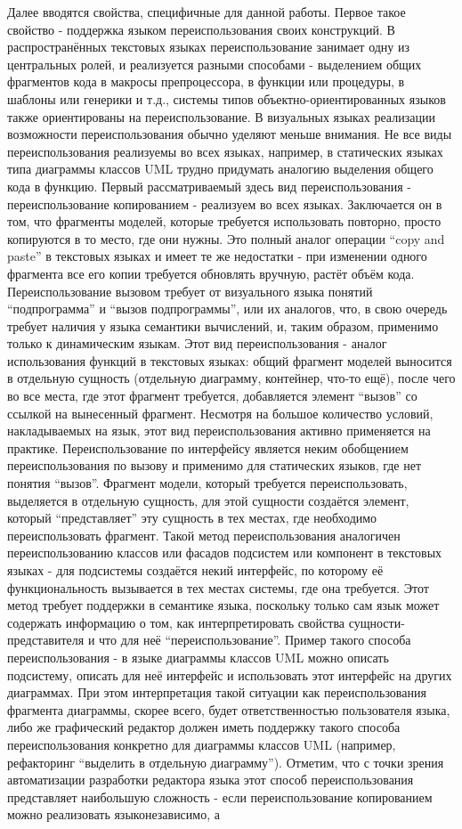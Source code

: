 Далее вводятся свойства, специфичные для данной работы. Первое такое свойство - поддержка языком переиспользования своих конструкций. В распространённых текстовых языках переиспользование занимает одну из центральных ролей, и реализуется разными способами - выделением общих фрагментов кода в макросы препроцессора, в функции или процедуры, в шаблоны или генерики и т.д., системы типов объектно-ориентированных языков также ориентированы на переиспользование. В визуальных языках реализации возможности переиспользования обычно уделяют меньше внимания. Не все виды переиспользования реализуемы во всех языках, например, в статических языках типа диаграммы классов UML трудно придумать аналогию выделения общего кода в функцию. Первый рассматриваемый здесь вид переиспользования - переиспользование копированием - реализуем во всех языках. Заключается он в том, что фрагменты моделей, которые требуется использовать повторно, просто копируются в то место, где они нужны. Это полный аналог операции “copy and paste” в текстовых языках и имеет те же недостатки - при изменении одного фрагмента все его копии требуется обновлять вручную, растёт объём кода. Переиспользование вызовом требует от визуального языка понятий “подпрограмма” и “вызов подпрограммы”, или их аналогов, что, в свою очередь требует наличия у языка семантики вычислений, и, таким образом, применимо только к динамическим языкам. Этот вид переиспользования - аналог использования функций в текстовых языках: общий фрагмент моделей выносится в отдельную сущность (отдельную диаграмму, контейнер, что-то ещё), после чего во все места, где этот фрагмент требуется, добавляется элемент “вызов” со ссылкой на вынесенный фрагмент. Несмотря на большое количество условий, накладываемых на язык, этот вид переиспользования активно применяется на практике. Переиспользование по интерфейсу является неким обобщением переиспользования по вызову и применимо для статических языков, где нет понятия “вызов”. Фрагмент модели, который требуется переиспользовать, выделяется в отдельную сущность, для этой сущности создаётся элемент, который “представляет” эту сущность в тех местах, где необходимо переиспользовать фрагмент. Такой метод переиспользования аналогичен переиспользованию классов или фасадов подсистем или компонент в текстовых языках - для подсистемы создаётся некий интерфейс, по которому её функциональность вызывается в тех местах системы, где она требуется. Этот метод требует поддержки в семантике языка, поскольку только сам язык может содержать информацию о том, как интерпретировать свойства сущности-представителя и что для неё “переиспользование”. Пример такого способа переиспользования - в языке диаграммы классов UML можно описать подсистему, описать для неё интерфейс и использовать этот интерфейс на других диаграммах. При этом интерпретация такой ситуации как переиспользования фрагмента диаграммы, скорее всего, будет ответственностью пользователя языка, либо же графический редактор должен иметь поддержку такого способа переиспользования конкретно для диаграммы классов UML (например, рефакторинг “выделить в отдельную диаграмму”). Отметим, что с точки зрения автоматизации разработки редактора языка этот способ переиспользования представляет наибольшую сложность - если переиспользование копированием можно реализовать языконезависимо, а 